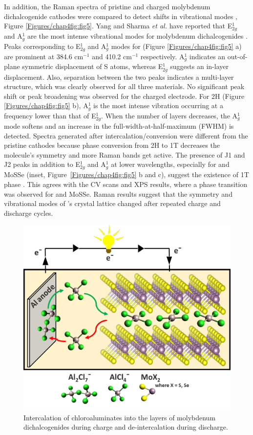 In addition, the Raman spectra of pristine and charged molybdenum dichalcogenide cathodes were compared to detect shifts in vibrational modes , Figure \ref{Figures/chap4fig:fig5}. Yang and Sharma \textit{et al.} have reported that E$^1_{2g}$ and A$^1_g$ are the most intense vibrational modes for molybdenum dichalcogenides \cite{yang_pressure-induced_2019,sharma_stable_2018}. Peaks corresponding to E$^1_{2g}$ and A$^1_g$ modes for  (Figure \ref{Figures/chap4fig:fig5} a) are prominent at 384.6 cm$^{-1}$ and 410.2 cm$^{-1}$ respectively. A$^1_g$ indicates an out-of-plane symmetric displacement of S atoms, whereas E$^1_{2g}$ suggests an in-layer displacement. Also, separation between the two peaks indicates a multi-layer structure, which was clearly observed for all three materials. No significant peak shift or peak broadening was observed for the charged  electrode. For 2H  (Figure \ref{Figures/chap4fig:fig5} b), A$^1_g$ is the most intense vibration occurring at a frequency lower than that of E$^1_{2g}$. When the number of layers decreases, the A$^1_g$ mode softens and an increase in the full-width-at-half-maximum (FWHM) is detected. Spectra generated after intercalation/conversion were different from the pristine cathodes because phase conversion from 2H to 1T decreases the molecule's symmetry and more Raman bands get active. The presence of J1 and J2 peaks in addition to E$^1_{2g}$ and A$^1_g$ at lower wavelengths, especially for  and MoSSe (inset, Figure\ \ref{Figures/chap4fig:fig5} b and c), suggest the existence of 1T phase . This agrees with the CV scans and XPS results, where a phase transition was observed for  and MoSSe. Raman results suggest that the symmetry and vibrational modes of 's crystal lattice changed after repeated charge and discharge cycles. 
\begin{figure}
  \centering
  \includegraphics[width=\textwidth]{Figures/chap4fig/graabs}
  \caption{Intercalation of chloroaluminates into the layers of molybdenum dichalcogenides during charge and de-intercalation during discharge.}
  \label{Figures/chap4fig:graabs}
\end{figure}
